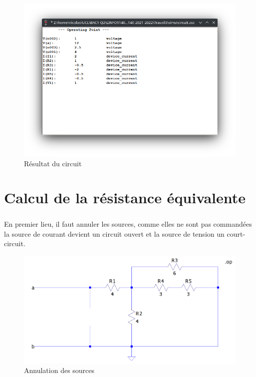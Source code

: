     \begin{figure}[H]
        \centering
        \includegraphics[scale=0.8]{../pictures/resultat.png} %
        \caption{Résultat du circuit}
    \end{figure}

\section{Calcul de la résistance équivalente}

    \subparagraph{}En premier lieu, il faut annuler les sources, comme elles ne sont pas commandées la source de courant devient un circuit ouvert et la source de tension un court-circuit.
    
        \begin{figure}[h!]
                \centering
                \includegraphics[width=\textwidth]{../pictures/cancel.png}
                \caption{Annulation des sources}
                \label{cancel}
            \end{figure}
            
